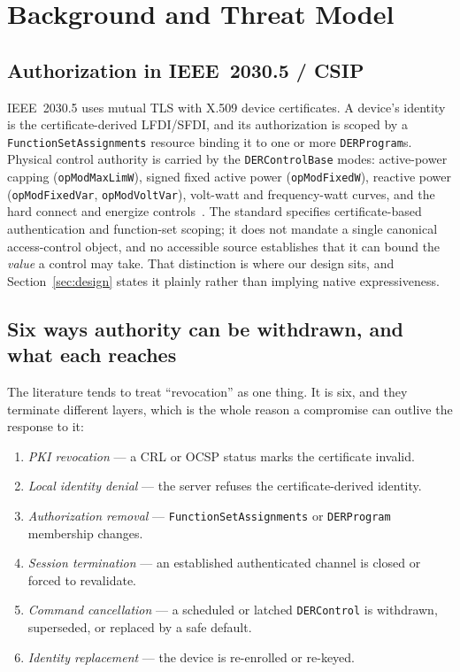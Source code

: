 \section{Background and Threat Model}\label{sec:threat}

\subsection{Authorization in IEEE~2030.5 / CSIP}
IEEE~2030.5 uses mutual TLS with X.509 device certificates. A device's identity is the
certificate-derived LFDI/SFDI, and its authorization is scoped by a
\texttt{FunctionSetAssignments} resource binding it to one or more \texttt{DERProgram}s.
Physical control authority is carried by the \texttt{DERControlBase} modes: active-power capping
(\texttt{opModMaxLimW}), signed fixed active power (\texttt{opModFixedW}), reactive power
(\texttt{opModFixedVar}, \texttt{opModVoltVar}), volt-watt and frequency-watt curves, and the hard
connect and energize controls~\cite{passos2025tutorial}. The standard specifies certificate-based
authentication and function-set scoping; it does not mandate a single canonical access-control
object, and no accessible source establishes that it can bound the \emph{value} a control may
take. That distinction is where our design sits, and Section~\ref{sec:design} states it plainly
rather than implying native expressiveness.

\subsection{Six ways authority can be withdrawn, and what each reaches}
The literature tends to treat ``revocation'' as one thing. It is six, and they terminate different
layers, which is the whole reason a compromise can outlive the response to it:

\begin{enumerate}\itemsep2pt
\item \emph{PKI revocation} --- a CRL or OCSP status marks the certificate invalid.
\item \emph{Local identity denial} --- the server refuses the certificate-derived identity.
\item \emph{Authorization removal} --- \texttt{FunctionSetAssignments} or \texttt{DERProgram}
      membership changes.
\item \emph{Session termination} --- an established authenticated channel is closed or forced to
      revalidate.
\item \emph{Command cancellation} --- a scheduled or latched \texttt{DERControl} is withdrawn,
      superseded, or replaced by a safe default.
\item \emph{Identity replacement} --- the device is re-enrolled or re-keyed.
\end{enumerate}

